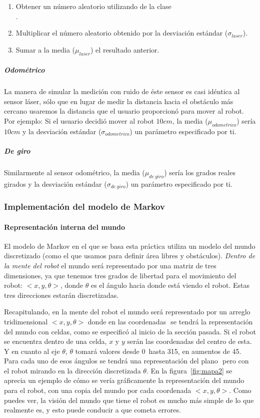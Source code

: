 \begin{enumerate}
  \item Obtener un número aleatorio utilizando  de la clase\\ .
  \item Multiplicar el número aleatorio obtenido por la desviación estándar (\( \sigma_{laser} \)).
  \item Sumar a la media (\( \mu_{laser} \)) el resultado anterior.
\end{enumerate}


\subparagraph{Odométrico}\medskip
La manera de simular la medición con ruido de éste sensor es casi idéntica al sensor láser, sólo que en lugar de medir la distancia hacia el obstáculo más cercano usaremos la distancia que el usuario proporcionó para mover al robot. Por ejemplo: Si el usuario decidió mover al robot \(10cm\), la media (\( \mu_{odometrico} \)) sería \(10cm\) y la desviación estándar (\( \sigma_{odometrico} \)) un parámetro especificado por ti.


\subparagraph{De giro}\medskip
Similarmente al sensor odométrico, la media (\( \mu_{de\ giro} \)) sería los grados reales girados y la desviación estándar (\( \sigma_{de\ giro} \)) un parámetro especificado por ti.

\subsubsection{Implementación del modelo de Markov}

\paragraph{Representación interna del mundo}\medskip

El modelo de Markov en el que se basa esta práctica utiliza un modelo del mundo discretizado (como el que usamos para definir área libres y obstáculos). \textit{Dentro de la mente del robot} el mundo será representado por una matriz de tres dimensiones, ya que tenemos tres grados de libertad para el movimiento del robot: \(<x,y,\theta>\), donde \( \theta \) es el ángulo hacia donde está viendo el robot. Estas tres direcciones estarán discretizadas.\par

Recapitulando, en la mente del robot el mundo será representado por un arreglo tridimensional \(<x,y,\theta>\) donde en las coordenadas \(<x,y>\) se tendrá la representación del mundo con celdas, como se especificó al inicio de la sección pasada. Si el robot se encuentra dentro de una celda, \(x\) y \(y\) serán las coordenadas del centro de esta. Y en cuanto al eje \(\theta\), \(\theta\) tomará valores desde 0\degree \ hasta 315\degree, en aumentos de 45\degree. Para cada uno de esos ángulos se tendrá una representación del plano \(<x,y>\) pero con el robot mirando en la dirección discretizada \(\theta\). En la figura~\ref{fig:mapa2} se aprecia un ejemplo de cómo se vería gráficamente la representación del mundo para el robot, con una copia del mundo por cada coordenada \(<x,y,\theta>\). Como puedes ver, la visión del mundo que tiene el robot es mucho más simple de lo que realmente es, y esto puede conducir a que cometa errores.

